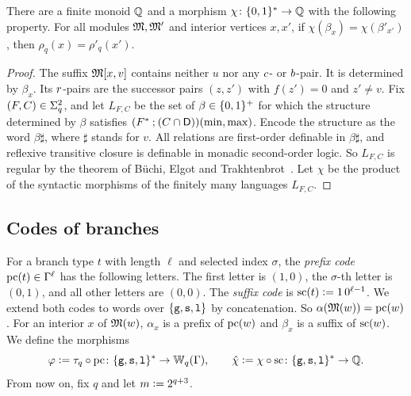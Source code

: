 \begin{lemma}[Suffixes]\label{lemma: suffixes}
  There are a finite monoid $\mathbb{Q}$ and a morphism $\chi \colon \{0,1\}^{*} \to \mathbb{Q}$ with the following property.
  For all modules $\mathfrak{M}, \mathfrak{M}'$ and interior vertices $x, x'$, if $\chi(\beta_x) = \chi(\beta'_{x'})$, then $\rho_q(x) = \rho'_q(x')$.
\end{lemma}
\begin{proof}
  The suffix $\mathfrak{M}[x, v]$ contains neither $u$ nor any $c$- or $b$-pair.
  It is determined by $\beta_x$.
  Its $r$-pairs are the successor pairs $(z, z')$ with $f(z') = 0$ and $z' \ne v$.
  Fix $(F, C) \in \Sigma_{q}^{2}$, and let $L_{F, C}$ be the set of $\beta \in \{0,1\}^{+}$ for which the structure determined by $\beta$ satisfies $(F^{*} \mathbin{;} (C \cap \mathsf{D}))(\min, \max)$.
  Encode the structure as the word $\beta\sharp$, where $\sharp$ stands for $v$.
  All relations are first-order definable in $\beta\sharp$, and reflexive transitive closure is definable in monadic second-order logic.
  So $L_{F, C}$ is regular by the theorem of B\"uchi, Elgot and Trakhtenbrot~\cite{buchiWeakSecondorderArithmetic1960}.
  Let $\chi$ be the product of the syntactic morphisms of the finitely many languages $L_{F, C}$.
\end{proof}

\subsection{Codes of branches}

For a branch type $t$ with length $\ell$ and selected index $\sigma$, the \emph{prefix code} $\mathrm{pc}(t) \in \Gamma^{\ell}$ has the following letters.
The first letter is $(1, 0)$, the $\sigma$-th letter is $(0, 1)$, and all other letters are $(0, 0)$.
The \emph{suffix code} is $\mathrm{sc}(t) \mathrel{\vcentcolon=} 1\,0^{\ell - 1}$.
We extend both codes to words over $\{\mathtt{g}, \mathtt{s}, \mathtt{l}\}$ by concatenation.
So $\alpha(\mathfrak{M}(w)) = \mathrm{pc}(w)$.
For an interior $x$ of $\mathfrak{M}(w)$, $\alpha_x$ is a prefix of $\mathrm{pc}(w)$ and $\beta_x$ is a suffix of $\mathrm{sc}(w)$.
We define the morphisms
\[
  \varphi \mathrel{\vcentcolon=} \tau_q \circ \mathrm{pc} \colon \{\mathtt{g}, \mathtt{s}, \mathtt{l}\}^{*} \to \mathbb{W}_{q}(\Gamma),
  \qquad
  \hat\chi \mathrel{\vcentcolon=} \chi \circ \mathrm{sc} \colon \{\mathtt{g}, \mathtt{s}, \mathtt{l}\}^{*} \to \mathbb{Q}.
\]
From now on, fix $q$ and let $m \mathrel{\vcentcolon=} 2^{q+3}$.

